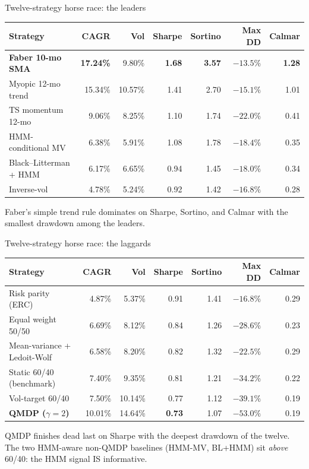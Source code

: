 \documentclass[11pt,aspectratio=169]{beamer}
\begin{document}
\begin{frame}{Twelve-strategy horse race: the leaders}
\centering\scriptsize\setlength{\tabcolsep}{5pt}\renewcommand{\arraystretch}{1.15}
\begin{tabular}{l rrrrrr}
\toprule
\textbf{Strategy} & \textbf{CAGR} & \textbf{Vol} & \textbf{Sharpe} & \textbf{Sortino} & \textbf{Max DD} & \textbf{Calmar} \\
\midrule
\rowcolor{cg!20}\textbf{Faber 10-mo SMA} & \textbf{17.24\%} & 9.80\%  & \textbf{1.68} & \textbf{3.57} & $-13.5\%$ & \textbf{1.28} \\
Myopic 12-mo trend                       & 15.34\% & 10.57\% & 1.41 & 2.70 & $-15.1\%$ & 1.01 \\
TS momentum 12-mo                        & 9.06\%  & 8.25\%  & 1.10 & 1.74 & $-22.0\%$ & 0.41 \\
HMM-conditional MV                       & 6.38\%  & 5.91\%  & 1.08 & 1.78 & $-18.4\%$ & 0.35 \\
Black--Litterman + HMM                   & 6.17\%  & 6.65\%  & 0.94 & 1.45 & $-18.0\%$ & 0.34 \\
Inverse-vol                              & 4.78\%  & 5.24\%  & 0.92 & 1.42 & $-16.8\%$ & 0.28 \\
\bottomrule
\end{tabular}

\medskip\small
Faber's simple trend rule \alert{dominates} on Sharpe, Sortino, and Calmar with the smallest drawdown among the leaders.
\end{frame}

\begin{frame}{Twelve-strategy horse race: the laggards}
\centering\scriptsize\setlength{\tabcolsep}{5pt}\renewcommand{\arraystretch}{1.15}
\begin{tabular}{l rrrrrr}
\toprule
\textbf{Strategy} & \textbf{CAGR} & \textbf{Vol} & \textbf{Sharpe} & \textbf{Sortino} & \textbf{Max DD} & \textbf{Calmar} \\
\midrule
Risk parity (ERC)                        & 4.87\%  & 5.37\%  & 0.91 & 1.41 & $-16.8\%$ & 0.29 \\
Equal weight 50/50                       & 6.69\%  & 8.12\%  & 0.84 & 1.26 & $-28.6\%$ & 0.23 \\
Mean-variance + Ledoit-Wolf              & 6.58\%  & 8.20\%  & 0.82 & 1.32 & $-22.5\%$ & 0.29 \\
Static 60/40 (benchmark)                 & 7.40\%  & 9.35\%  & 0.81 & 1.21 & $-34.2\%$ & 0.22 \\
Vol-target 60/40                         & 7.50\%  & 10.14\% & 0.77 & 1.12 & $-39.1\%$ & 0.19 \\
\rowcolor{cr!18}\textbf{QMDP ($\gamma{=}2$)} & 10.01\% & 14.64\% & \textbf{0.73} & 1.07 & $\mathbf{-53.0\%}$ & 0.19 \\
\bottomrule
\end{tabular}

\medskip\small
\alert{QMDP finishes dead last on Sharpe} with the deepest drawdown of the twelve. The two HMM-aware non-QMDP baselines (HMM-MV, BL+HMM) sit \emph{above} 60/40: the HMM signal IS informative.
\end{frame}
\end{document}
